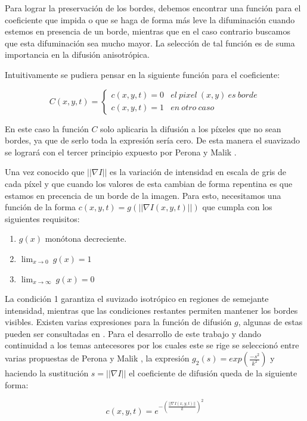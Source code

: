 \documentclass[a4paper,10pt,twocolumn]{article}
\begin{document}
Para lograr la preservaci\'on de los bordes, debemos encontrar una funci\'on para el coeficiente que impida o que se haga de forma m\'as leve la difuminaci\'on cuando estemos en presencia de un borde, mientras que en el caso contrario buscamos que esta difuminaci\'on sea mucho mayor. La selecci\'on de tal funci\'on es de suma importancia en la difusi\'on anisotr\'opica. 

Intuitivamente se pudiera pensar en la siguiente funci\'on para el coeficiente:

$$
C(x,y,t)=
\begin{cases}
c(x,y,t) = 0 & el\ pixel\ (x,y)\ es\ borde \\
c(x,y,t) = 1 & en\ otro\ caso 
\end{cases}
$$

En este caso la funci\'on $C$ solo aplicaria la difusi\'on a los p\'ixeles que no sean bordes, ya que de serlo toda la expresi\'on ser\'ia cero. De esta manera el suavizado se lograr\'a con el tercer principio expuesto por Perona y Malik \cite{perona_malik}.

Una vez conocido que $||\nabla I||$ es la variaci\'on de intensidad en escala de gris de cada p\'ixel y que cuando los valores de esta cambian de forma repentina es que estamos en precencia de un borde de la imagen. Para esto, necesitamos una funci\'on de la forma $c(x,y,t) = g(|| \nabla I(x,y,t) ||)$ que cumpla con los siguientes requisitos:

\begin{enumerate} 
\item $g(x)$ mon\'otona decreciente.
\item $\lim_{x \to 0}\ g(x) = 1$
\item $\lim_{x \to \infty}\ g(x) = 0$
\end{enumerate}

La condici\'on 1 garantiza el suvizado isotr\'opico en regiones de semejante intensidad, mientras que las condiciones restantes permiten mantener los bordes visibles. Existen varias expresiones para la funci\'on de difusi\'on $g$, algunas de estas pueden ser consultadas en \cite{borroto}. Para el desarrollo de este trabajo y dando continuidad a los temas antecesores por los cuales este se rige se seleccion\'o entre varias propuestas de Perona y Malik \cite{perona_malik}, la expresi\'on $g_2(s) = exp(\frac{-s^2}{k^2})$ y haciendo la sustituci\'on $s=||\nabla I||$ el coeficiente de difusi\'on queda de la siguiente forma:

\begin{equation}
	c(x,y,t) = e^{-(\frac{||\nabla I(x,y,t)||}{k})^2}
\end{equation}
\end{document}
